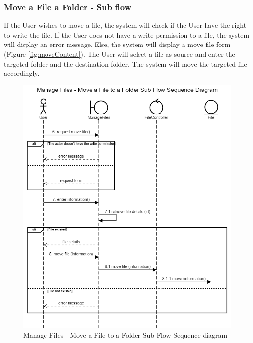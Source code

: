 \subsubsection{Move a File a Folder - Sub flow}
If the User wishes to move a file, the system will check if the User have the right to write the file. If the User does not have a write permission to a file, the system will display an error message. Else, the system will display a move file form (Figure \ref{fig:moveContent}). The User will select a file as source and enter the targeted folder and the destination folder. The system will move the targeted file accordingly.  
\begin{figure}[H]
    \centering
    \includegraphics[width=1.0\textwidth]{images/Manage Files - Move a File to a Folder Sub Flow Sequence Diagram.png}
    \caption{Manage Files - Move a File to a Folder Sub Flow Sequence diagram}
    \label{fig:SeqFilesMove}
\end{figure}
